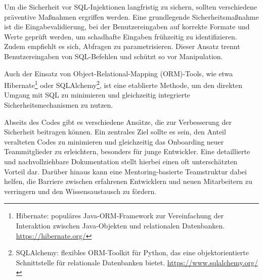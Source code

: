 \documentclass[a4paper,10pt,parskip,twocolumn]{article}
\begin{document}
    Um die Sicherheit vor SQL-Injektionen langfristig zu sichern, sollten verschiedene präventive Maßnahmen ergriffen werden. Eine grundlegende Sicherheitsmaßnahme ist die Eingabevalidierung, bei der Benutzereingaben auf korrekte Formate und Werte geprüft werden, um schadhafte Eingaben frühzeitig zu identifizieren. Zudem empfiehlt es sich, Abfragen zu parametrisieren. Dieser Ansatz trennt Benutzereingaben von SQL-Befehlen und schützt so vor Manipulation.\par Auch der Einsatz von Object-Relational-Mapping (ORM)-Tools, wie etwa Hibernate\footnote{Hibernate: populäres Java-ORM-Framework zur Vereinfachung der Interaktion zwischen Java-Objekten und relationalen Datenbanken. \url{https://hibernate.org/}} oder SQLAlchemy\footnote{SQLAlchemy: flexibles ORM-Toolkit für Python, das eine objektorientierte Schnittstelle für relationale Datenbanken bietet. \url{https://www.sqlalchemy.org/}}, ist eine etablierte Methode, um den direkten Umgang mit SQL zu minimieren und gleichzeitig integrierte Sicherheitsmechanismen zu nutzen. \par 
    Abseits des Codes gibt es verschiedene Ansätze, die zur Verbesserung der Sicherheit beitragen können. Ein zentrales Ziel sollte es sein, den Anteil veralteten Codes zu minimieren und gleichzeitig das Onboarding neuer Teammitglieder zu erleichtern, besonders für junge Entwickler. Eine detaillierte und nachvollziehbare Dokumentation stellt hierbei einen oft unterschätzten Vorteil dar. Darüber hinaus kann eine Mentoring-basierte Teamstruktur dabei helfen, die Barriere zwischen erfahrenen Entwicklern und neuen Mitarbeitern zu verringern und den Wissensaustausch zu fördern.\cite{10.1145/2652524.2652540}


%

%
\printbibliography
\end{document}
